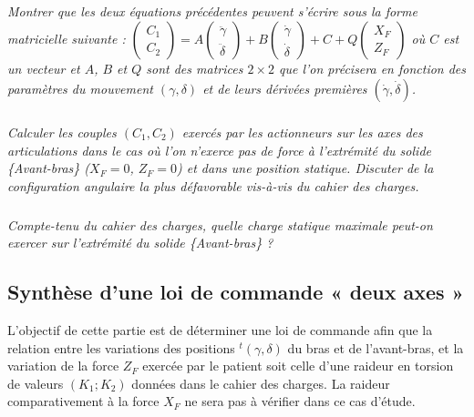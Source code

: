 \begin{multicols}{2}
\subparagraph{}\textit{Montrer que les deux équations précédentes peuvent s'écrire sous la forme matricielle suivante : 
$\begin{pmatrix}
C_1 \\ C_2
\end{pmatrix}
=
A
\begin{pmatrix}
\ddot{\gamma} \\ \ddot{\delta}
\end{pmatrix}
+
B
\begin{pmatrix}
\dot{\gamma} \\ \dot{\delta}
\end{pmatrix}
+
C
+
Q
\begin{pmatrix}
X_F \\ Z_F
\end{pmatrix}$ où $C$ est un vecteur et $A$, $B$ et $Q$ sont des matrices $2\times 2$ que l'on précisera en fonction des paramètres du mouvement $\left(\gamma,\delta\right)$ et de leurs dérivées premières $\left(\dot{\gamma},\dot{\delta}\right)$.
}

\ifprof
\begin{corrige}
\end{corrige}
\else
\fi


\subparagraph{}
\textit{Calculer les couples $(C_1,C_2)$ exercés par les actionneurs sur les axes des articulations dans le cas où
l’on n’exerce pas de force à l’extrémité du solide \{Avant-bras\} ($X_F = 0$, $Z_F = 0$) et dans une position statique. Discuter de la configuration angulaire la plus défavorable vis-à-vis du cahier des charges.}
\ifprof
\begin{corrige}
\end{corrige}
\else
\fi


\subparagraph{}
\textit{Compte-tenu du cahier des charges, quelle charge statique maximale peut-on exercer sur l’extrémité du solide \{Avant-bras\} ?}
\ifprof
\begin{corrige}
\end{corrige}
\else
\fi



\subsection*{Synthèse d’une loi de commande « deux axes »}

\begin{obj}
L’objectif de cette partie est de déterminer une loi de commande afin que la relation entre les variations
des positions $ ^t\left(\gamma,\delta\right)$ du bras et de l’avant-bras, et la variation de la force $Z_F$ exercée par le patient soit celle d’une raideur en torsion de valeurs $(K_1;K_2)$ données dans le cahier des charges. La raideur comparativement à la force $X_F$ ne sera pas à vérifier dans ce cas d’étude.
\end{obj}



\end{multicols}
